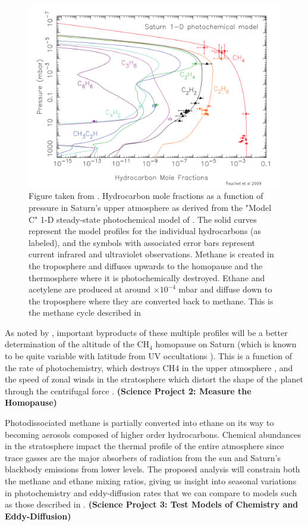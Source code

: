 \documentclass[twocolumn, twocolappendix, numberedappendix, linenumbers]{aastex631}
\newcommand{\tdex}[1]{$\times 10^{#1}$}  %
\begin{document}
\begin{figure}[ht]
\centering
\includegraphics[width=\textwidth]{figs/Fouchet09.png}

\caption{
\footnotesize
Figure taken from \cite{Fouchet09}. Hydrocarbon mole fractions as a function of
pressure in Saturn's upper atmosphere as derived from the "Model C" 1-D
steady-state photochemical model of \cite{Moses05}. The solid curves represent
the model profiles for the individual hydrocarbons (as labeled), and the
symbols with associated error bars represent current infrared and ultraviolet
observations. Methane is created in the troposphere and diffuses upwards to the
homopause and the thermosphere where it is photochemically destroyed. Ethane
and acetylene are produced at around \tdex{-4} mbar and diffuse down to the
troposphere where they are converted back to methane. This is the methane cycle
described in \cite{Strobel69}
}

\label{fig:FouchetPlot}
\end{figure}

As noted by \cite{Fouchet09}, important byproducts of these multiple profiles
will be a better determination of the altitude of the CH$_4$ homopause on
Saturn (which is known to be quite variable with latitude from UV occultations
\citealp{Koskinen13, Koskinen15}). This is a function of the rate of
photochemistry, which destroys CH$4$ in the upper atmosphere \citep{Fouchet09},
and the speed of zonal winds in the stratosphere which distort the shape of the
planet through the centrifugal force \citep{Merritt19}.  {\bf (Science Project
2: Measure the Homopause)}

Photodissociated methane is partially converted into ethane on its way to
becoming aerosols composed of higher order hydrocarbons. Chemical abundances in
the stratosphere impact the thermal profile of the entire atmosphere since
trace gasses are the major absorbers of radiation from the sun and Saturn's
blackbody emissions from lower levels. The proposed analysis will constrain
both the methane and ethane mixing ratios, giving us insight into seasonal
variations in photochemistry and eddy-diffusion rates that we can compare to
models such as those described in \cite{Moses05}. {\bf (Science Project 3:
Test Models of Chemistry and Eddy-Diffusion)}
\end{document}
